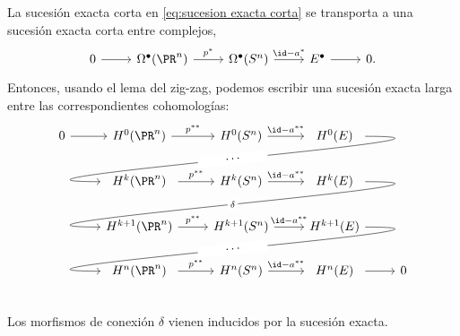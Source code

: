 \documentclass[12pt]{article}
\begin{document}
La sucesión exacta corta en \eqref{eq:sucesion exacta corta} se transporta a una sucesión
exacta corta entre complejos,
\begin{equation*}
	\begin{tikzcd}
		0 \arrow[r] & \Omega^\bullet(\PR^n) \arrow[r, "p^\ast"] & \Omega^\bullet(S^n) \arrow[r, "\id -
		a^\ast"] & E^\bullet \arrow[r] & 0.
	\end{tikzcd}
\end{equation*}
Entonces, usando el lema del zig-zag, podemos escribir una sucesión exacta larga entre las
correspondientes cohomologías:
\begin{equation}\label{eq:sucesion exacta larga}
	\begin{tikzcd}
		0 \arrow[r] & H^0(\PR^n) \arrow[r, "p^{\ast \ast}"] & H^0(S^n) \arrow[r, "\id -
		a^{\ast \ast}"] & \makebox[\widthof{$H^{k+1}(E)$}][c]{$H^0(E)$}  \arrow[dll,
		"\qquad\cdots\qquad" {font=\normalsize, description, sloped}, out=0, in=180, looseness=1.6, overlay] \\
						 & \makebox[\widthof{$H^{k+1}(\PR^n)$}][c]{$H^k(\PR^n)$} \arrow[r, "p^{\ast \ast}"] & H^k(S^n) \arrow[r, "\id -
		a^{\ast \ast}"] & \makebox[\widthof{$H^{k+1}(E)$}][c]{$H^k(E)$} \arrow[dll, "\delta"
		description, out=0, in=180, looseness=1.6,
		overlay] \\
						 & H^{k+1}(\PR^n) \arrow[r, "p^{\ast \ast}"] & H^{k+1}(S^n) \arrow[r, "\id -
		a^{\ast \ast}"] & H^{k+1}(E) \arrow[dll, "\qquad\cdots\qquad" {font=\normalsize, description,
		sloped}, out=0, in=180, looseness=1.6, overlay] \\
						 & \makebox[\widthof{$H^{k+1}(\PR^n)$}][c]{$H^n(\PR^n)$} \arrow[r, "p^{\ast \ast}"] & H^n(S^n) \arrow[r,
			"\id - a^{\ast \ast}"] & \makebox[\widthof{$H^{k+1}(E)$}][c]{$H^n(E)$}  \arrow[r] & 0 \\		 
		\end{tikzcd}
\end{equation}
Los morfismos de conexión \( \delta \) vienen inducidos por la sucesión exacta.



\parbreak
\end{document}
